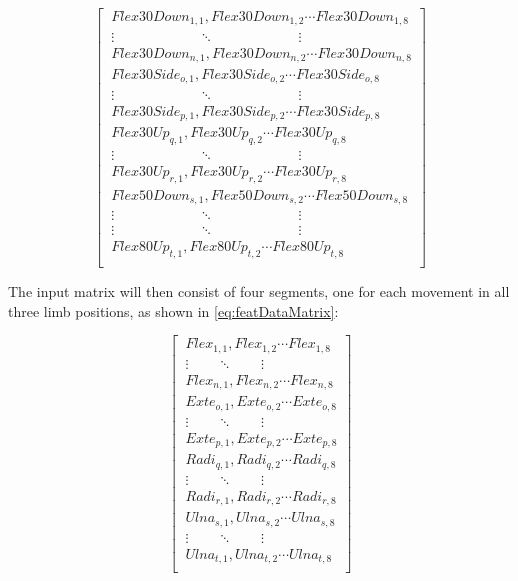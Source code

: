 \begin{equation} \label{eq:segMatrix}
\begin{bmatrix} 
\ Flex30Down_{1,1}, Flex30Down_{1,2} \cdots Flex30Down_{1,8} \\ 
\ \vdots \qquad \qquad \qquad \ddots \qquad \qquad \qquad \vdots \\
\ Flex30Down_{n,1}, Flex30Down_{n,2} \cdots Flex30Down_{n,8} \\
\ Flex30Side_{o,1}, Flex30Side_{o,2} \cdots Flex30Side_{o,8} \\
\ \vdots \qquad \qquad \qquad \ddots \qquad \qquad \qquad \vdots \\
\ Flex30Side_{p,1}, Flex30Side_{p,2} \cdots Flex30Side_{p,8} \\
\ Flex30Up_{q,1}, Flex30Up_{q,2} \cdots Flex30Up_{q,8} \\
\ \vdots \qquad \qquad \qquad \ddots \qquad \qquad \qquad \vdots \\
\ Flex30Up_{r,1}, Flex30Up_{r,2} \cdots Flex30Up_{r,8} \\
\ Flex50Down_{s,1}, Flex50Down_{s,2} \cdots Flex50Down_{s,8} \\
\ \vdots \qquad \qquad \qquad \ddots \qquad \qquad \qquad \vdots \\
\ \vdots \qquad \qquad \qquad \ddots \qquad \qquad \qquad \vdots \\
\ Flex80Up_{t,1}, Flex80Up_{t,2} \cdots Flex80Up_{t,8} \\
\end{bmatrix}
\end{equation}

The input matrix will then consist of four segments, one for each movement in all three limb positions, as shown in \eqref{eq:featDataMatrix}:

\begin{equation} \label{eq:featDataMatrix}
\begin{bmatrix} 
\ Flex_{1,1}, Flex_{1,2} \cdots Flex_{1,8} \\ 
\ \vdots \qquad \ddots \qquad \vdots \\
\ Flex_{n,1}, Flex_{n,2} \cdots Flex_{n,8} \\
\ Exte_{o,1}, Exte_{o,2} \cdots Exte_{o,8} \\
\ \vdots \qquad \ddots \qquad \vdots \\
\ Exte_{p,1}, Exte_{p,2} \cdots Exte_{p,8} \\
\ Radi_{q,1}, Radi_{q,2} \cdots Radi_{q,8} \\
\ \vdots \qquad \ddots \qquad \vdots \\
\ Radi_{r,1}, Radi_{r,2} \cdots Radi_{r,8} \\
\ Ulna_{s,1}, Ulna_{s,2} \cdots Ulna_{s,8} \\
\ \vdots \qquad \ddots \qquad \vdots \\
\ Ulna_{t,1}, Ulna_{t,2} \cdots Ulna_{t,8} \\
\end{bmatrix}
\end{equation}

